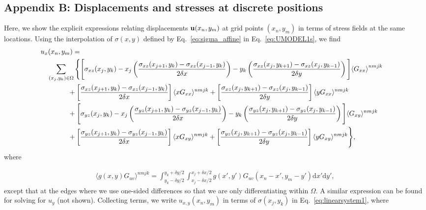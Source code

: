 \documentclass[aps,prl,reprint,twocolumn,groupedaddress,showpacs]{revtex4-1}
\def\dd{\mbox{d}}
\def\u{{\bf u}}
\begin{document}
\begin{widetext}
\section{Appendix B: Displacements and stresses at discrete positions}

Here, we show the explicit expressions relating displacements $\u(x_{n}, y_{m})$ at 
grid points $(x_{n},y_{m})$ in terms of stress fields at the same locations. Using 
the interpolation of $\sigma(x,y)$ defined by Eq.~\ref{eq:sigma_affine} in 
Eq.~\ref{eq:UMODEL1s}, we find
%
\begin{align}
\lefteqn{u_x(x_n,y_m) =}  \nonumber\\
 & \quad \sum_{(x_j,y_k)\in\Omega} \Bigg\{ \Bigg[\sigma_{xz}(x_j,y_k)
- x_j\left(\frac{\sigma_{xz}(x_{j+1},y_k) - \sigma_{xz}(x_{j-1},y_k)}{2\delta x}\right)
 -y_k\left( \frac{\sigma_{xz}(x_j,y_{k+1}) -
\sigma_{xz}(x_j,y_{k-1})}{2\delta y}\right) \Bigg]{\langle G_{xx} \rangle}^{nmjk} \nonumber \\
& \qquad\qquad +\left[ \frac{\sigma_{xz}(x_{j+1},y_k) -
\sigma_{xz}(x_{j-1},y_k)}{2\delta x}\right]\langle xG_{xx} \rangle^{nmjk} + \left[  \frac{\sigma_{xz}(x_j,y_{k+1}) - \sigma_{xz}(x_j,y_{k-1}) }{2\delta y} \right]
\langle yG_{xx} \rangle^{nmjk}\nonumber\\
&\qquad\qquad + \Bigg[\sigma_{yz}(x_j,y_k)-x_j\left(\frac{\sigma_{yz}(x_{j+1},y_k)-
\sigma_{yz}(x_{j-1},y_k) }{2\delta x}\right)-y_k\left( \frac{\sigma_{yz}(x_j,y_{k+1}) 
-\sigma_{yz}(x_j,y_{k-1}) }{2\delta y}\right) \Bigg] \langle G_{xy} \rangle^{nmjk}\nonumber \\
&\qquad\qquad +\left[ \frac{\sigma_{yz}(x_{j+1},y_k) - 
\sigma_{yz}(x_{j-1},y_k) }{2\delta x}\right]  
\langle xG_{xy} \rangle^{nmjk} + 
\left[\frac{\sigma_{yz}(x_j,y_{k+1}) - 
\sigma_{yz}(x_j,y_{k-1}) }{2\delta y}\right]\langle yG_{xy} \rangle^{nmjk} \Bigg\},
\label{eq:ux_decomposed}
\end{align}
%
where

\begin{align}
\langle g(x,y)G_{uv} \rangle^{nmjk} = \int_{y_k-\delta y/2}^{y_k+\delta y/2} 
\int_{x_j-\delta x/2}^{x_j+\delta x/2} g(x',y')
G_{uv}(x_n-x',y_m-y')\dd x'\dd y', \label{eq:G_ave} 
\end{align}
%
except that at the edges where we use one-sided differences so that we
are only differentiating within $\Omega$. A similar expression can be
found for solving for $u_y$ (not shown). Collecting terms, we 
write $u_{x,y}(x_{n},y_{m})$ in terms of $\sigma(x_{j}, y_{k})$ 
in Eq.~\ref{eq:linearsystem1}, where 


\end{widetext}
\end{document}
